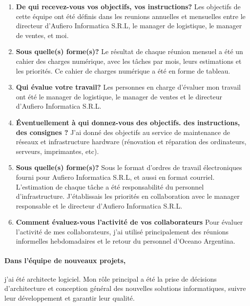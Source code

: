 \documentclass{resume} %
\begin{document}
		\begin{enumerate}
		\item \textbf{De qui recevez-vous vos objectifs, vos instructions?}
			Les objectifs de cette équipe ont été définis dans les reunions annuelles et mensuelles entre le directeur d'Aufiero Informatica S.R.L, le manager de logistique, le manager de ventes, et moi.
		\item \textbf{Sous quelle(s) forme(s)?}
			Le résultat de chaque réunion mensuel a été un cahier des charges numérique, avec les tâches par mois, leurs estimations et les priorités. Ce cahier de charges numérique  a été en forme de tableau.
		\item \textbf{Qui évalue votre travail?}
			Les personnes en charge d'évaluer mon travail ont été  le manager de logistique, le manager de ventes et le directeur d'Aufiero Informatica S.R.L. 
		\item  \textbf{Éventuellement à qui donnez-vous des objectifs. des instructions, des consignes ?}
			J'ai donné des objectifs au service de maintenance de réseaux et infrastructure hardware (rénovation et réparation des ordinateurs, serveurs, imprimantes, etc).
		\item \textbf{Sous quelle(s) forme(s)?}
			Sous le format d'ordres de travail électroniques fourni pour Aufiero Informatica S.R.L, et aussi en format courriel. L'estimation de chaque tâche a été responsabilité du personnel d'infrastructure. 
			J'\'etablissais les priorités en collaboration avec le manager responsable et le directeur d'Aufiero Informatica S.R.L.  
		\item \textbf{Comment évaluez-vous l'activité de vos collaborateurs}
			Pour évaluer l'activité de mes collaborateurs, j'ai utilisé principalement des réunions informelles hebdomadaires et le retour du personnel d'Oceano Argentina. 
		\end{enumerate}
		
		\paragraph{Dans l'équipe de nouveaux projets,} j'ai été architecte logiciel. Mon rôle principal a été la  prise de décisions d'architecture et conception général des nouvelles solutions informatiques, suivre leur développement et garantir leur qualité. 
		
\end{document}
